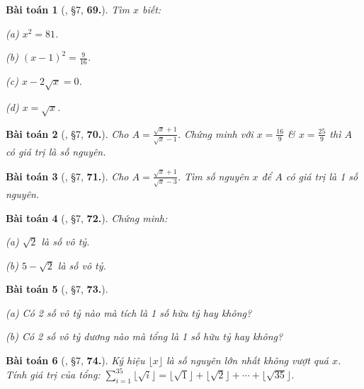 \documentclass{article}
\numberwithin{equation}{section}
\newtheorem{baitoan}{Bài toán}
\begin{document}
\begin{baitoan}[\cite{Binh_Toan_7_tap_1}, \S7, \textbf{69.}]
	Tìm $x$ biết:
	\begin{enumerate*}
		\item[(a)] $x^2 = 81$.
		\item[(b)] $(x - 1)^2 = \frac{9}{16}$.
		\item[(c)] $x - 2\sqrt{x} = 0$.
		\item[(d)] $x = \sqrt{x}$.
	\end{enumerate*}
\end{baitoan}

\begin{baitoan}[\cite{Binh_Toan_7_tap_1}, \S7, \textbf{70.}]
	Cho $A = \frac{\sqrt{x} + 1}{\sqrt{x} - 1}$. Chứng minh với $x = \frac{16}{9}$ \& $x = \frac{25}{9}$ thì $A$ có giá trị là số nguyên.
\end{baitoan}

\begin{baitoan}[\cite{Binh_Toan_7_tap_1}, \S7, \textbf{71.}]
	Cho $A = \frac{\sqrt{x} + 1}{\sqrt{x} - 3}$. Tìm số nguyên $x$ để $A$ có giá trị là 1 số nguyên.
\end{baitoan}

\begin{baitoan}[\cite{Binh_Toan_7_tap_1}, \S7, \textbf{72.}]
	Chứng minh:
	\begin{enumerate*}
		\item[(a)] $\sqrt{2}$ là số vô tỷ.
		\item[(b)] $5 - \sqrt{2}$ là số vô tỷ.
	\end{enumerate*}
\end{baitoan}

\begin{baitoan}[\cite{Binh_Toan_7_tap_1}, \S7, \textbf{73.}]
	\begin{enumerate*}
		\item[(a)] Có 2 số vô tỷ nào mà tích là 1 số hữu tỷ hay không?
		\item[(b)] Có 2 số vô tỷ dương nào mà tổng là 1 số hữu tỷ hay không?
	\end{enumerate*}
\end{baitoan}

\begin{baitoan}[\cite{Binh_Toan_7_tap_1}, \S7, \textbf{74.}]
	Ký hiệu $\lfloor x\rfloor$ là số nguyên lớn nhất không vượt quá $x$. Tính giá trị của tổng: $\sum_{i=1}^{35} \lfloor\sqrt{i}\rfloor = \lfloor\sqrt{1}\rfloor + \lfloor\sqrt{2}\rfloor + \cdots + \lfloor\sqrt{35}\rfloor$.
\end{baitoan}
\end{document}
